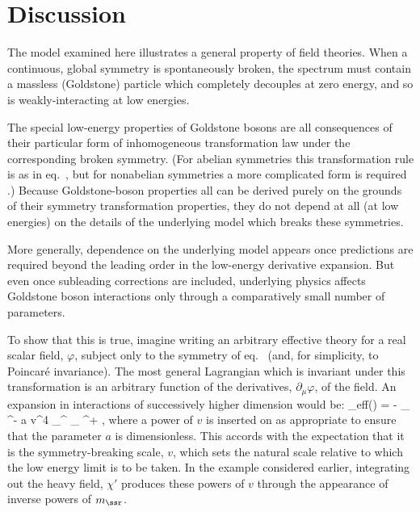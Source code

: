 \section{Discussion}

The model examined here illustrates a general property of
field theories. When a continuous, global symmetry is
spontaneously broken, the spectrum must contain a massless
(Goldstone) particle which completely decouples at zero energy, and so
is weakly-interacting at low energies. 

The special low-energy properties of Goldstone bosons are all
consequences of their particular form of inhomogeneous transformation
law under the corresponding broken symmetry. (For abelian 
symmetries this transformation rule is as in eq.~,
but for nonabelian symmetries a more complicated form
is required \cite{ChiPT}.) Because 
Goldstone-boson properties all can be derived 
purely on the grounds of their symmetry transformation properties, 
they do not depend at all (at low energies) on the details of the 
underlying model which breaks these symmetries. 

More generally, dependence on the underlying model appears
once predictions are required beyond the leading order in the
low-energy derivative expansion. But even once subleading
corrections are included, underlying physics affects Goldstone
boson interactions only through a comparatively small number 
of parameters. 

To show that this is true, imagine writing an arbitrary effective theory for a
real scalar field, $\varphi$, subject only to the symmetry of
eq.~ (and, for simplicity, to Poincar\'e invariance).  The
most general Lagrangian which is invariant under this transformation is an
arbitrary function of the derivatives, $\partial_\mu\varphi$, of the field.
An expansion in interactions of successively higher dimension 
would be:
%
\eq
\label{abelgbaction}
\Scl_{\rm eff}(\varphi) = - \hf \; \partial_\mu \varphi 
\partial^\mu \varphi - {a \over
v^4} \;  \partial_\mu \varphi \partial^\mu \varphi \; \partial_\nu \varphi
\partial^\nu \varphi + \cdots,
\eeq
%
where a power of $v$ is inserted on as appropriate to ensure that the
parameter $a$ is dimensionless. This accords with the expectation
that it is the symmetry-breaking scale, $v$, which sets the natural scale
relative to which the low energy limit is to be taken. In the example
considered earlier, integrating out the heavy field, $\chi'$ 
produces these powers of $v$ through the appearance of 
inverse  powers of $m_\ssr$. 

